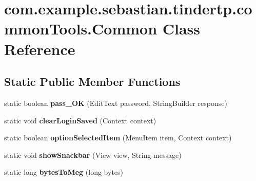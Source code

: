 \hypertarget{classcom_1_1example_1_1sebastian_1_1tindertp_1_1commonTools_1_1Common}{}\section{com.\+example.\+sebastian.\+tindertp.\+common\+Tools.\+Common Class Reference}
\label{classcom_1_1example_1_1sebastian_1_1tindertp_1_1commonTools_1_1Common}
\subsection*{Static Public Member Functions}
\begin{DoxyCompactItemize}
\item 
static boolean {\bfseries pass\+\_\+\+OK} (Edit\+Text password, String\+Builder response)\hypertarget{classcom_1_1example_1_1sebastian_1_1tindertp_1_1commonTools_1_1Common_aa8a00a26fec3015d703474c715548ceb}{}\label{classcom_1_1example_1_1sebastian_1_1tindertp_1_1commonTools_1_1Common_aa8a00a26fec3015d703474c715548ceb}

\item 
static void {\bfseries clear\+Login\+Saved} (Context context)\hypertarget{classcom_1_1example_1_1sebastian_1_1tindertp_1_1commonTools_1_1Common_a602f78b647b4c1617a2173a9d94d97a1}{}\label{classcom_1_1example_1_1sebastian_1_1tindertp_1_1commonTools_1_1Common_a602f78b647b4c1617a2173a9d94d97a1}

\item 
static boolean {\bfseries option\+Selected\+Item} (Menu\+Item item, Context context)\hypertarget{classcom_1_1example_1_1sebastian_1_1tindertp_1_1commonTools_1_1Common_ad5a698303b87f0930ce1f129d87e22c2}{}\label{classcom_1_1example_1_1sebastian_1_1tindertp_1_1commonTools_1_1Common_ad5a698303b87f0930ce1f129d87e22c2}

\item 
static void {\bfseries show\+Snackbar} (View view, String message)\hypertarget{classcom_1_1example_1_1sebastian_1_1tindertp_1_1commonTools_1_1Common_af59bc9ff042336c3d62c4bc55bd45499}{}\label{classcom_1_1example_1_1sebastian_1_1tindertp_1_1commonTools_1_1Common_af59bc9ff042336c3d62c4bc55bd45499}

\item 
static long {\bfseries bytes\+To\+Meg} (long bytes)\hypertarget{classcom_1_1example_1_1sebastian_1_1tindertp_1_1commonTools_1_1Common_aedc85af8b31ee8f5ef82a63055bcb1bd}{}\label{classcom_1_1example_1_1sebastian_1_1tindertp_1_1commonTools_1_1Common_aedc85af8b31ee8f5ef82a63055bcb1bd}

\end{DoxyCompactItemize}
